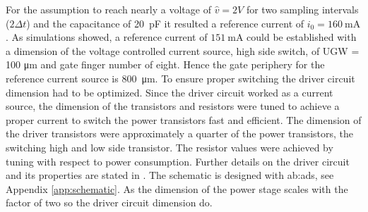 For the assumption to reach nearly a voltage of $\hat{v} = 2V$ for two sampling intervals ($2 \Delta t$) and the capacitance of \SI{20}{\pico \farad} it resulted a reference current of $i_0 = \SI{160}{\milli \ampere}$.
As simulations showed, a reference current of $\SI{151}{\milli \ampere}$ could be established with a dimension of the voltage controlled current source, high side switch, of UGW = 100 \si{\micro \meter} and gate finger number of eight.
Hence the gate periphery for the reference current source is \SI{800}{\micro \meter}.
To ensure proper switching the driver circuit dimension had to be optimized.
Since the driver circuit worked as a current source, the dimension of the transistors and resistors were tuned to achieve a proper current to switch the power transistors fast and efficient.
The dimension of the driver transistors were approximately a quarter of the power transistors, the switching high and low side transistor.
The resistor values were achieved by tuning with respect to power consumption.
Further details on the driver circuit and its properties are stated in \cite{MaksimovicPaper}.
The schematic is designed with \gls{ab:ads}, see Appendix \ref{app:schematic}.
As the dimension of the power stage scales with the factor of two so the driver circuit dimension do.

